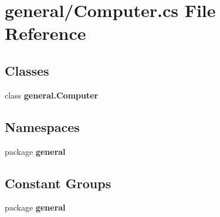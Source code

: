 \section{general/\-Computer.cs File Reference}
\label{_computer_8cs}
\subsection*{Classes}
\begin{DoxyCompactItemize}
\item 
class {\bf general.\-Computer}
\end{DoxyCompactItemize}
\subsection*{Namespaces}
\begin{DoxyCompactItemize}
\item 
package {\bf general}
\end{DoxyCompactItemize}
\subsection*{Constant Groups}
\begin{DoxyCompactItemize}
\item 
package {\bf general}
\end{DoxyCompactItemize}
